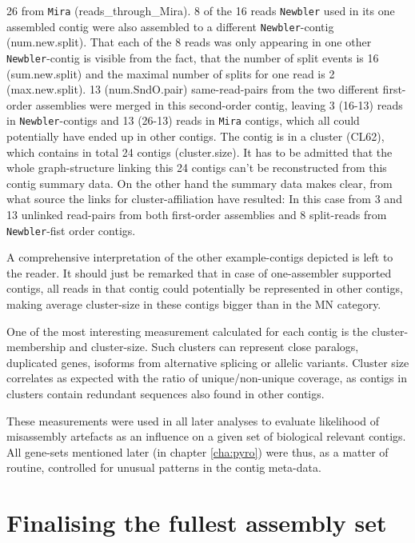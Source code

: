 26 from \texttt{Mira} (reads\_through\_Mira). 8 of the 16 reads
\texttt{Newbler} used in its one assembled contig were also assembled
to a different \texttt{Newbler}-contig (num.new.split). That each of
the 8 reads was only appearing in one other \texttt{Newbler}-contig is
visible from the fact, that the number of split events is 16
(sum.new.split) and the maximal number of splits for one read is 2
(max.new.split). 13 (num.SndO.pair) same-read-pairs from the two
different first-order assemblies were merged in this second-order
contig, leaving 3 (16-13) reads in \texttt{Newbler}-contigs and 13
(26-13) reads in \texttt{Mira} contigs, which all could potentially
have ended up in other contigs. The contig is in a cluster (CL62),
which contains in total 24 contigs (cluster.size). It has to be
admitted that the whole graph-structure linking this 24 contigs can't
be reconstructed from this contig summary data. On the other hand the
summary data makes clear, from what source the links for
cluster-affiliation have resulted: In this case from 3 and 13 unlinked
read-pairs from both first-order assemblies and 8 split-reads from
\texttt{Newbler}-fist order contigs.

A comprehensive interpretation of the other example-contigs depicted
is left to the reader. It should just be remarked that in case of
one-assembler supported contigs, all reads in that contig could
potentially be represented in other contigs, making average
cluster-size in these contigs bigger than in the MN category.

One of the most interesting measurement calculated for each contig is
the cluster-membership and cluster-size. Such clusters can represent
close paralogs, duplicated genes, isoforms from alternative splicing
or allelic variants. Cluster size correlates as expected with the
ratio of unique/non-unique coverage, as contigs in clusters contain
redundant sequences also found in other contigs.

These measurements were used in all later analyses to evaluate
likelihood of misassembly artefacts as an influence on a given set of
biological relevant contigs. All gene-sets mentioned later (in chapter
\ref{cha:pyro}) were thus, as a matter of routine, controlled for
unusual patterns in the contig meta-data.

\section{Finalising the fullest assembly set}
\label{sec:final-full-assembly}

